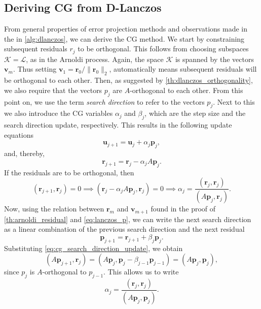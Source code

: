 \subsection{Deriving CG from D-Lanczos}
From general properties of error projection methods and observations made in the in \cref{alg:dlanczos}, we can derive the CG method. We start by constraining subsequent residuals $r_j$ to be orthogonal. This follows from choosing subspaces $\mathcal{K} = \mathcal{L}$, as in the Arnoldi process. Again, the space $\mathcal{K}$ is spanned by the vectors $\mathbf{v}_m$. Thus setting $\mathbf{v}_1 = \mathbf{r}_0/\|\mathbf{r}_0\|_2$, automatically means subsequent residuals will be orthogonal to each other. Then, as suggested by \cref{th:dlanczos_orthogonality}, we also require that the vectors $p_j$ are $A$-orthogonal to each other. From this point on, we use the term \textit{search direction} to refer to the vectors $p_j$. Next to this we also introduce the CG variables $\alpha_j$ and $\beta_j$, which are the step size and the search direction update, respectively. This results in the following update equations
\begin{equation}
  \mathbf{u}_{j+1} = \mathbf{u}_j + \alpha_j \mathbf{p}_j,
  \label{eq:cg_solution_update}
\end{equation}
and, thereby,
\begin{equation}
  \mathbf{r}_{j+1} = \mathbf{r}_j - \alpha_j A \mathbf{p}_j.
  \label{eq:cg_residual_update}
\end{equation}
If the residuals are to be orthogonal, then
\[
  (\mathbf{r}_{j+1}, \mathbf{r}_j) = 0 \implies (\mathbf{r}_j - \alpha_j A \mathbf{p}_j, \mathbf{r}_j) = 0 \implies \alpha_j = \frac{(\mathbf{r}_j, \mathbf{r}_j)}{(A \mathbf{p}_j, \mathbf{r}_j)}.
\]
Now, using the relation between $\mathbf{r}_m$ and $\mathbf{v}_{m+1}$ found in the proof of \cref{th:arnoldi_residual} and \cref{eq:lanczos_p}, we can write the next search direction as a linear combination of the previous search direction and the next residual
\begin{equation}
  \mathbf{p}_{j+1} = \mathbf{r}_{j+1} + \beta_j \mathbf{p}_j.
  \label{eq:cg_search_direction_update}
\end{equation}
Substituting \cref{eq:cg_search_direction_update}, we obtain
\[
  (A\mathbf{p}_{j+1}, \mathbf{r}_j) = (A\mathbf{p}_j, \mathbf{p}_j -\beta_{j-1}\mathbf{p}_{j-1}) = (A\mathbf{p}_j, \mathbf{p}_j),
\]
since $p_j$ is $A$-orthogonal to $p_{j-1}$. This allows us to write
\begin{equation}
  \alpha_j = \frac{(\mathbf{r}_j, \mathbf{r}_j)}{(A \mathbf{p}_j, \mathbf{p}_j)}.
  \label{eq:cg_alpha}
\end{equation}
